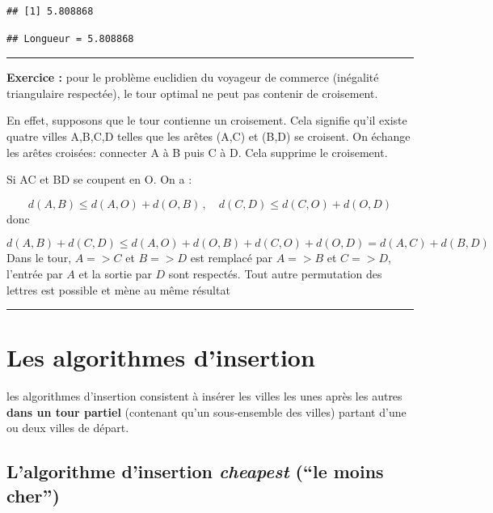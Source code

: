 \documentclass[
]{article}
\begin{document}
\begin{verbatim}
## [1] 5.808868
\end{verbatim}

\begin{verbatim}
## Longueur = 5.808868
\end{verbatim}

\begin{center}\rule{0.5\linewidth}{0.5pt}\end{center}

\textbf{Exercice :} pour le problème euclidien du voyageur de commerce
(inégalité triangulaire respectée), le tour optimal ne peut pas contenir
de croisement.

En effet, supposons que le tour contienne un croisement. Cela signifie
qu'il existe quatre villes A,B,C,D telles que les arêtes (A,C) et (B,D)
se croisent. On échange les arêtes croisées: connecter A à B puis C à D.
Cela supprime le croisement.

Si AC et BD se coupent en O. On a :

\[d(A,B) \le d(A,O) + d(O,B) \,,\quad d(C,D) \le d(C,O) + d(O,D) \] donc

\[d(A,B) + d(C,D) \le d(A,O) + d(O,B) + d(C,O) + d(O,D) = d(A,C) + d(B,D)\]
Dans le tour, \(A => C\) et \(B => D\) est remplacé par \(A => B\) et
\(C => D\), l'entrée par \(A\) et la sortie par \(D\) sont respectés.
Tout autre permutation des lettres est possible et mène au même résultat

\begin{center}\rule{0.5\linewidth}{0.5pt}\end{center}

\section{Les algorithmes d'insertion}\label{les-algorithmes-dinsertion}

les algorithmes d'insertion consistent à insérer les villes les unes
après les autres \textbf{dans un tour partiel} (contenant qu'un
sous-ensemble des villes) partant d'une ou deux villes de départ.

\subsection{\texorpdfstring{L'algorithme d'insertion \emph{cheapest}
(``le moins
cher'')}{L'algorithme d'insertion cheapest (``le moins cher'')}}\label{lalgorithme-dinsertion-cheapest-le-moins-cher}
\end{document}
